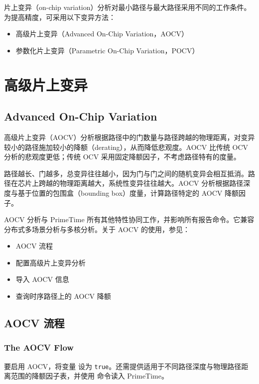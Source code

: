 \label{chap:var}

片上变异（on-chip variation）分析对最小路径与最大路径采用不同的工作条件。为提高精度，可采用以下变异方法：
\begin{itemize}
  \item 高级片上变异（Advanced On-Chip Variation，AOCV）
  \item 参数化片上变异（Parametric On-Chip Variation，POCV）
\end{itemize}

\section{高级片上变异}
\subsection*{Advanced On-Chip Variation}

高级片上变异（AOCV）分析根据路径中的门数量与路径跨越的物理距离，对变异较小的路径施加较小的降额（derating），从而降低悲观度。AOCV 比传统 OCV 分析的悲观度更低；传统 OCV 采用固定降额因子，不考虑路径特有的度量。

路径越长、门越多，总变异往往越小，因为门与门之间的随机变异会相互抵消。路径在芯片上跨越的物理距离越大，系统性变异往往越大。AOCV 分析根据路径深度与基于位置的包围盒（bounding box）度量，计算路径特定的 AOCV 降额因子。

AOCV 分析与 PrimeTime 所有其他特性协同工作，并影响所有报告命令。它兼容分布式多场景分析与多核分析。关于 AOCV 的使用，参见：
\begin{itemize}
  \item AOCV 流程
  \item 配置高级片上变异分析
  \item 导入 AOCV 信息
  \item 查询时序路径上的 AOCV 降额
\end{itemize}

\subsection{AOCV 流程}
\subsubsection*{The AOCV Flow}

要启用 AOCV，将变量  设为 \texttt{true}。还需提供适用于不同路径深度与物理路径距离范围的降额因子表，并使用  命令读入 PrimeTime。

